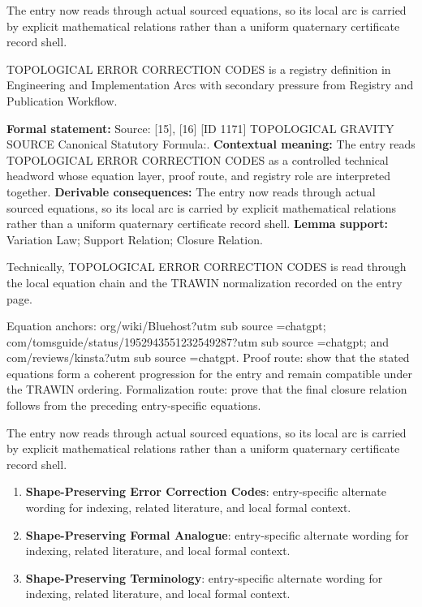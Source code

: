 The entry now reads through actual sourced equations, so its local arc is carried by explicit mathematical relations rather than a uniform quaternary certificate record shell.
\clearpage


\begingroup\small
{}
TOPOLOGICAL ERROR CORRECTION CODES is a registry definition in Engineering and Implementation Arcs with secondary pressure from Registry and Publication Workflow.

\begingroup\footnotesize\setlength{\emergencystretch}{3em}\sloppy
\textbf{Formal statement:} Source: [15], [16] [ID 1171] TOPOLOGICAL GRAVITY SOURCE Canonical Statutory Formula:. \textbf{Contextual meaning:} The entry reads TOPOLOGICAL ERROR CORRECTION CODES as a controlled technical headword whose equation layer, proof route, and registry role are interpreted together. \textbf{Derivable consequences:} The entry now reads through actual sourced equations, so its local arc is carried by explicit mathematical relations rather than a uniform quaternary certificate record shell. \textbf{Lemma support:} Variation Law; Support Relation; Closure Relation.\par
\endgroup

Technically, TOPOLOGICAL ERROR CORRECTION CODES is read through the local equation chain and the TRAWIN normalization recorded on the entry page.

Equation anchors: org/wiki/Bluehost?utm sub source =chatgpt; com/tomsguide/status/1952943551232549287?utm sub source =chatgpt; and com/reviews/kinsta?utm sub source =chatgpt. Proof route: show that the stated equations form a coherent progression for the entry and remain compatible under the TRAWIN ordering. Formalization route: prove that the final closure relation follows from the preceding entry-specific equations.

The entry now reads through actual sourced equations, so its local arc is carried by explicit mathematical relations rather than a uniform quaternary certificate record shell.
\endgroup

\begin{enumerate}[leftmargin=1.6em,itemsep=6pt,topsep=4pt]
\item \textbf{Shape-Preserving Error Correction Codes}: entry-specific alternate wording for indexing, related literature, and local formal context.
\item \textbf{Shape-Preserving Formal Analogue}: entry-specific alternate wording for indexing, related literature, and local formal context.
\item \textbf{Shape-Preserving Terminology}: entry-specific alternate wording for indexing, related literature, and local formal context.
\end{enumerate}

